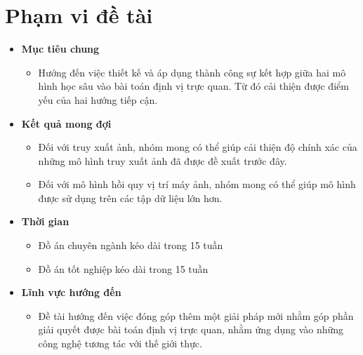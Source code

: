 \section{Phạm vi đề tài}
\begin{itemize}
    \item \textbf{Mục tiêu chung} 
    \begin{itemize}
        \item Hướng đến việc thiết kế và áp dụng thành công sự kết hợp giữa hai mô hình học sâu vào bài toán định vị trực quan. Từ đó cải thiện được điểm yếu của hai hướng tiếp cận.
    \end{itemize} 
    \item \textbf{Kết quả mong đợi}
    \begin{itemize}
        \item Đối với truy xuất ảnh, nhóm mong có thể giúp cải thiện độ chính xác của những mô hình truy xuất ảnh đã được đề xuất trước đây.
        \item Đối với mô hình hồi quy vị trí máy ảnh, nhóm mong có thể giúp mô hình được sử dụng trên các tập dữ liệu lớn hơn.
    \end{itemize}
    \item \textbf{Thời gian}
    \begin{itemize}
        \item Đồ án chuyên ngành kéo dài trong 15 tuần
        \item Đồ án tốt nghiệp kéo dài trong 15 tuần
    \end{itemize}
    \item \textbf{Lĩnh vực hướng đến}
    \begin{itemize}
        \item Đề tài hướng đến việc đóng góp thêm một giải pháp mới nhằm góp phần giải quyết được bài toán định vị trực quan, nhằm ứng dụng vào những công nghệ tương tác với thế giới thực.
    \end{itemize}
    
\end{itemize}

